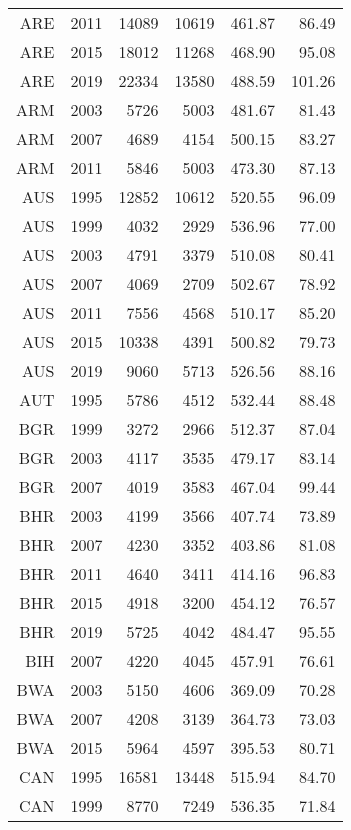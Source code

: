 \begin{longtable}{|r|r|r|r|r|r|}
\hline \hline
\endlastfoot
    ARE   & 2011  & 14089 & 10619 & 461.87 & 86.49 \\
    ARE   & 2015  & 18012 & 11268 & 468.90 & 95.08 \\
    ARE   & 2019  & 22334 & 13580 & 488.59 & 101.26 \\
    ARM   & 2003  & 5726  & 5003  & 481.67 & 81.43 \\
    ARM   & 2007  & 4689  & 4154  & 500.15 & 83.27 \\
    ARM   & 2011  & 5846  & 5003  & 473.30 & 87.13 \\
    AUS   & 1995  & 12852 & 10612 & 520.55 & 96.09 \\
    AUS   & 1999  & 4032  & 2929  & 536.96 & 77.00 \\
    AUS   & 2003  & 4791  & 3379  & 510.08 & 80.41 \\
    AUS   & 2007  & 4069  & 2709  & 502.67 & 78.92 \\
    AUS   & 2011  & 7556  & 4568  & 510.17 & 85.20 \\
    AUS   & 2015  & 10338 & 4391  & 500.82 & 79.73 \\
    AUS   & 2019  & 9060  & 5713  & 526.56 & 88.16 \\
    AUT   & 1995  & 5786  & 4512  & 532.44 & 88.48 \\
    BGR   & 1999  & 3272  & 2966  & 512.37 & 87.04 \\
    BGR   & 2003  & 4117  & 3535  & 479.17 & 83.14 \\
    BGR   & 2007  & 4019  & 3583  & 467.04 & 99.44 \\
    BHR   & 2003  & 4199  & 3566  & 407.74 & 73.89 \\
    BHR   & 2007  & 4230  & 3352  & 403.86 & 81.08 \\
    BHR   & 2011  & 4640  & 3411  & 414.16 & 96.83 \\
    BHR   & 2015  & 4918  & 3200  & 454.12 & 76.57 \\
    BHR   & 2019  & 5725  & 4042  & 484.47 & 95.55 \\
    BIH   & 2007  & 4220  & 4045  & 457.91 & 76.61 \\
    BWA   & 2003  & 5150  & 4606  & 369.09 & 70.28 \\
    BWA   & 2007  & 4208  & 3139  & 364.73 & 73.03 \\
    BWA   & 2015  & 5964  & 4597  & 395.53 & 80.71 \\
    CAN   & 1995  & 16581 & 13448 & 515.94 & 84.70 \\
    CAN   & 1999  & 8770  & 7249  & 536.35 & 71.84 \\

\end{longtable}
